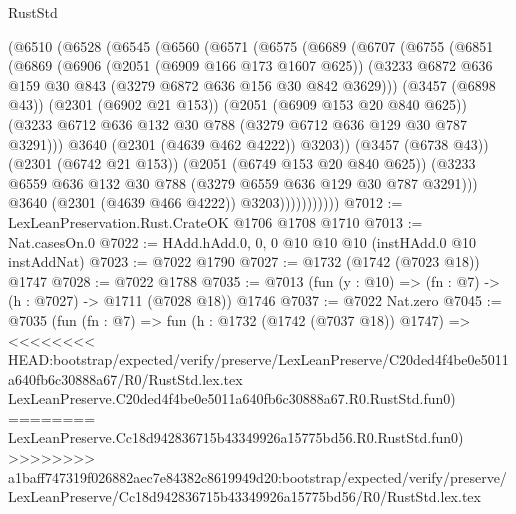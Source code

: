 \begin{lexlean}{RustStd}
\begin{coremodule}
{\begin{coremodule}
{{{{{{{{{{{{{            (@6510
              (@6528
                (@6545
                  (@6560
                    (@6571
                      (@6575
                        (@6689
                          (@6707
                            (@6755
                              (@6851
                                (@6869
                                  (@6906
                                    (@2051 (@6909 @166 @173 @1607 @625))
                                    (@3233
                                      @6872
                                      @636
                                      @159
                                      @30
                                      @843
                                      (@3279 @6872 @636 @156 @30 @842 @3629)))
                                  (@3457 (@6898 @43))
                                  (@2301 (@6902 @21 @153))
                                  (@2051 (@6909 @153 @20 @840 @625))
                                  (@3233
                                    @6712
                                    @636
                                    @132
                                    @30
                                    @788
                                    (@3279 @6712 @636 @129 @30 @787 @3291)))
                                @3640
                                (@2301 (@4639 @462 @4222))
                                @3203))
                            (@3457 (@6738 @43))
                            (@2301 (@6742 @21 @153))
                            (@2051 (@6749 @153 @20 @840 @625))
                            (@3233 @6559 @636 @132 @30 @788 (@3279 @6559 @636 @129 @30 @787 @3291)))
                          @3640
                          (@2301 (@4639 @466 @4222))
                          @3203)))))))))))
@7012 := LexLeanPreservation.Rust.CrateOK @1706 @1708 @1710
@7013 := Nat.casesOn.{0}
@7022 := HAdd.hAdd.{0, 0, 0} @10 @10 @10 (instHAdd.{0} @10 instAddNat)
@7023 := @7022 @1790
@7027 := @1732 (@1742 (@7023 @18)) @1747
@7028 := @7022 @1788
@7035 := @7013 (fun (y : @10) => (fn : @7) -> (h : @7027) -> @1711 (@7028 @18)) @1746
@7037 := @7022 Nat.zero
@7045 := @7035
    (fun (fn : @7) =>
    fun (h : @1732 (@1742 (@7037 @18)) @1747) =>
<<<<<<<< HEAD:bootstrap/expected/verify/preserve/LexLeanPreserve/C20ded4f4be0e5011a640fb6c30888a67/R0/RustStd.lex.tex
    LexLeanPreserve.C20ded4f4be0e5011a640fb6c30888a67.R0.RustStd.fun0)
========
    LexLeanPreserve.Cc18d942836715b43349926a15775bd56.R0.RustStd.fun0)
>>>>>>>> a1baff747319f026882aec7e84382c8619949d20:bootstrap/expected/verify/preserve/LexLeanPreserve/Cc18d942836715b43349926a15775bd56/R0/RustStd.lex.tex
}}}}}}}}}}}}}
\end{coremodule}}
\end{coremodule}
\end{lexlean}
